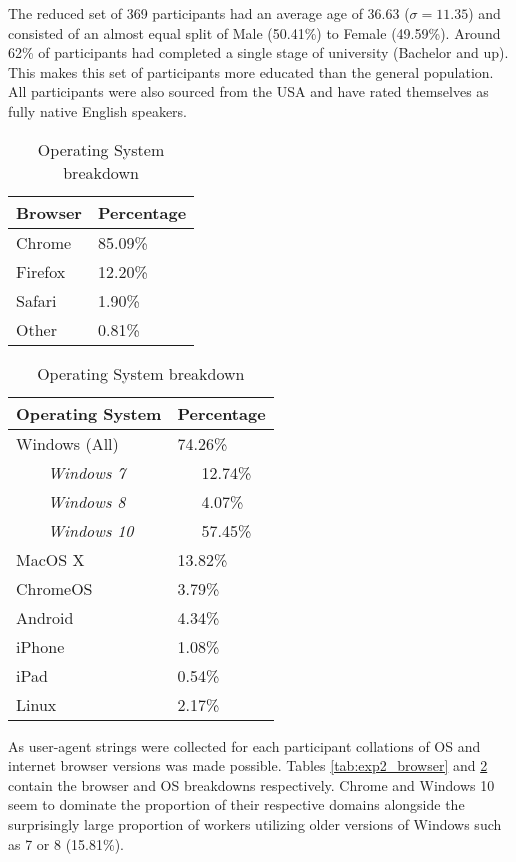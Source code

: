 The reduced set of 369 participants had an average age of 36.63 ($\sigma = 11.35$) and consisted of an almost equal split of Male (50.41\%) to Female (49.59\%). Around 62\% of participants had completed a single stage of university (Bachelor and up). This makes this set of participants more educated than the general population. All participants were also sourced from the USA and have rated themselves as fully native English speakers.
\begin{table}[!h]
    \centering
    \begin{tabular}{|l|l|}
        \hline
        Browser & Percentage \\
        \hline
        Chrome & 85.09\% \\
        Firefox & 12.20\% \\
        Safari & 1.90\% \\
        Other & 0.81\% \\
        \hline
    \end{tabular}
    \caption{Internet Browser breakdown}
    \label{tab:exp2_browser}
    \begin{tabular}{|l|l|}
        \hline
        Operating System & Percentage \\
        \hline
        
        \hline
        Windows (All) & 74.26\% \\
        ~~~~\textit{Windows 7} & ~~~12.74\% \\
        ~~~~\textit{Windows 8} & ~~~4.07\% \\
        ~~~~\textit{Windows 10} & ~~~57.45\% \\
        MacOS X	 & 13.82\% \\
        ChromeOS & 3.79\% \\
        Android	& 4.34\% \\
        iPhone	& 1.08\% \\
        iPad	& 0.54\% \\
        Linux	& 2.17\% \\
        \hline
    \end{tabular}
    \caption{Operating System breakdown}
    \label{tab:exp2_os}
\end{table}
    
As user-agent strings were collected for each participant collations of OS and internet browser versions was made possible. Tables \ref{tab:exp2_browser} and \ref{tab:exp2_os} contain the browser and OS breakdowns respectively. Chrome and Windows 10 seem to dominate the proportion of their respective domains alongside the surprisingly large proportion of workers utilizing older versions of Windows such as 7 or 8 (15.81\%).

